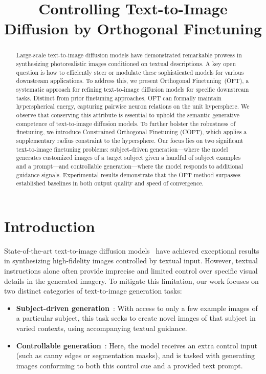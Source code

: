 \title{Controlling Text-to-Image Diffusion by Orthogonal Finetuning}

\begin{abstract}
Large-scale text-to-image diffusion models have demonstrated remarkable prowess in synthesizing photorealistic images conditioned on textual descriptions. A key open question is how to efficiently steer or modulate these sophisticated models for various downstream applications. To address this, we present Orthogonal Finetuning~(OFT), a systematic approach for refining text-to-image diffusion models for specific downstream tasks. Distinct from prior finetuning approaches, OFT can formally maintain hyperspherical energy, capturing pairwise neuron relations on the unit hypersphere. We observe that conserving this attribute is essential to uphold the semantic generative competence of text-to-image diffusion models. To further bolster the robustness of finetuning, we introduce Constrained Orthogonal Finetuning (COFT), which applies a supplementary radius constraint to the hypersphere. Our focus lies on two significant text-to-image finetuning problems: subject-driven generation—where the model generates customized images of a target subject given a handful of subject examples and a prompt—and controllable generation—where the model responds to additional guidance signals. Experimental results demonstrate that the OFT method surpasses established baselines in both output quality and speed of convergence.
\end{abstract}

\section{Introduction}

State-of-the-art text-to-image diffusion models~\cite{saharia2022photorealistic,ramesh2022hierarchical,rombach2022high} have achieved exceptional results in synthesizing high-fidelity images controlled by textual input. However, textual instructions alone often provide imprecise and limited control over specific visual details in the generated imagery. To mitigate this limitation, our work focuses on two distinct categories of text-to-image generation tasks:

\begin{itemize}[leftmargin=*,nosep]

    \item \textbf{Subject-driven generation}~\cite{ruiz2023dreambooth}: With access to only a few example images of a particular subject, this task seeks to create novel images of that subject in varied contexts, using accompanying textual guidance.
    \item \textbf{Controllable generation}~\cite{zhang2023adding,mou2023t2i}: Here, the model receives an extra control input (such as canny edges or segmentation masks), and is tasked with generating images conforming to both this control cue and a provided text prompt.
\end{itemize}

